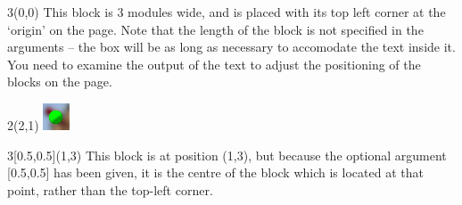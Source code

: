 \documentclass{beamer}
\begin{document}
\begin{frame}
\begin{textblock}{3}(0,0)
This block is 3 modules wide, and is placed with its top left corner
at the `origin' on the page. Note that the length of the block is not
specified in the arguments -- the box will be as long as necessary to
accomodate the text inside it. You need to examine the output of the
text to adjust the positioning of the blocks on the page.
\end{textblock}
\end{frame}

\begin{frame}
\begin{textblock}{2}(2,1)
\includegraphics{gravatar.png}
\end{textblock}
\end{frame}

\begin{frame}
\begin{textblock}{3}[0.5,0.5](1,3)
This block is at position (1,3), but because the optional argument
[0.5,0.5] has been given, it is the centre of the block which is
located at that point, rather than the top-left corner.
\end{textblock}
\end{frame}
\end{document}
